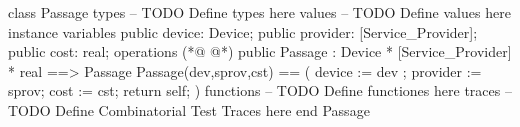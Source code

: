 \begin{vdmpp}[breaklines=true]
class Passage
types
-- TODO Define types here
values
-- TODO Define values here
instance variables
  public device: Device;
  public provider: [Service_Provider];
  public cost: real;
operations
(*@
\label{Passage:11}
@*)
 public Passage : Device * [Service_Provider] * real ==> Passage
   Passage(dev,sprov,cst) == (
    device := dev ;
   provider := sprov;
   cost := cst;
   return self;
  )
functions
-- TODO Define functiones here
traces
-- TODO Define Combinatorial Test Traces here
end Passage
\end{vdmpp}
